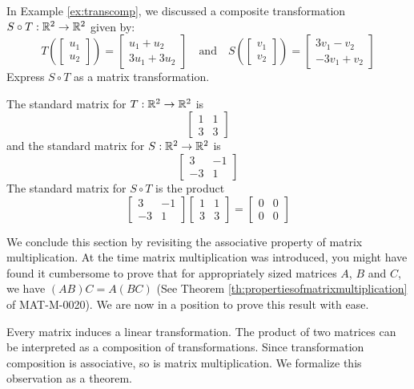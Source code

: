 \documentclass{ximera}
\begin{document}
\begin{example}
In Example \ref{ex:transcomp}, we discussed a composite transformation $S\circ T:\mathbb{R}^2\rightarrow \mathbb{R}^2$
given by:
$$T\left(\begin{bmatrix}u_1\\u_2\end{bmatrix}\right)=\begin{bmatrix}u_1+u_2\\3u_1+3u_2\end{bmatrix}\quad \text{and} \quad
S\left(\begin{bmatrix}v_1\\v_2\end{bmatrix}\right)=\begin{bmatrix}3v_1-v_2\\-3v_1+v_2\end{bmatrix}$$
Express $S\circ T$ as a matrix transformation.
\begin{explanation}
The standard matrix for $T:\mathbb{R}^2\rightarrow \mathbb{R}^2$ is $$\begin{bmatrix}1&1\\3&3\end{bmatrix}$$ and the standard matrix for $S:\mathbb{R}^2\rightarrow \mathbb{R}^2$ is $$\begin{bmatrix}3&-1\\-3&1\end{bmatrix}$$
The standard matrix for $S\circ T$ is the product
$$\begin{bmatrix}3&-1\\-3&1\end{bmatrix}\begin{bmatrix}1&1\\3&3\end{bmatrix}=\begin{bmatrix}0&0\\0&0\end{bmatrix}$$
\end{explanation}
\end{example}

We conclude this section by revisiting the associative property of matrix multiplication.  At the time matrix multiplication was introduced, you might have found it cumbersome to prove that for appropriately sized matrices $A$, $B$ and $C$, we have $(AB)C=A(BC)$ (See Theorem \ref{th:propertiesofmatrixmultiplication} of MAT-M-0020).  We are now in a position to prove this result with ease.  

Every matrix induces a linear transformation.  The product of two matrices can be interpreted as a composition of transformations.  Since transformation composition is associative, so is matrix multiplication. We formalize this observation as a theorem.
\end{document}
